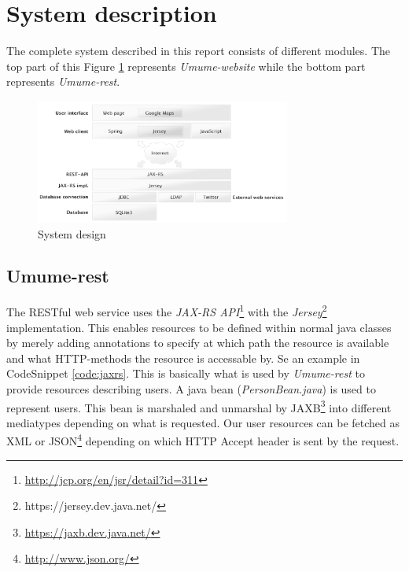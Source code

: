 \documentclass[titlepage, twocolumn, a4paper, 10pt]{article}
\begin{document}
\section{System description}\label{sec:system}



The complete system described in this report consists of different
modules. The top part of this Figure \ref{fig:images/sysdes}
represents \textit{Umume-website} while the bottom part represents
\textit{Umume-rest}.

\begin{figure}[H]
  \centering
  \includegraphics[width=3.3in]{images/systemarchitecture.jpg}
  \caption{System design}
  \label{fig:images/sysdes}
\end{figure}

\subsection{Umume-rest}\label{sec:umume-rest}
The RESTful web service uses the \textit{JAX-RS
  API}\footnote{\url{http://jcp.org/en/jsr/detail?id=311}} with the
\textit{Jersey}\footnote{https://jersey.dev.java.net/} implementation.
This enables resources to be defined within normal java classes by
merely adding annotations to specify at which path the resource is
available and what HTTP-methods the resource is accessable by. Se an
example in CodeSnippet \ref{code:jaxrs}. This is basically what is
used by \textit{Umume-rest} to provide resources describing users. A
java bean (\textit{PersonBean.java}) is used to represent users. This
bean is marshaled and unmarshal by
JAXB\footnote{\url{https://jaxb.dev.java.net/}} into different
mediatypes depending on what is requested. Our user resources can be
fetched as XML or JSON\footnote{\url{http://www.json.org/}} depending
on which HTTP Accept header is sent by the request.
\end{document}
